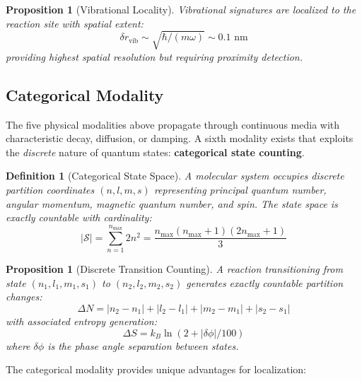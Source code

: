 \documentclass[11pt,a4paper]{article}
\newtheorem{definition}[theorem]{Definition}
\newtheorem{proposition}[theorem]{Proposition}
\theoremstyle{remark}
\begin{document}
\begin{proposition}[Vibrational Locality]
\label{prop:vib_local}
Vibrational signatures are localized to the reaction site with spatial extent:
\begin{equation}
    \delta r_{\text{vib}} \sim \sqrt{\hbar/(m\omega)} \sim 0.1 \text{ nm}
\end{equation}
providing highest spatial resolution but requiring proximity detection.
\end{proposition}

\subsection{Categorical Modality}
\label{sec:categorical_modality}

The five physical modalities above propagate through continuous media with characteristic decay, diffusion, or damping. A sixth modality exists that exploits the \textit{discrete} nature of quantum states: \textbf{categorical state counting}.

\begin{definition}[Categorical State Space]
A molecular system occupies discrete partition coordinates $(n, l, m, s)$ representing principal quantum number, angular momentum, magnetic quantum number, and spin. The state space is exactly countable with cardinality:
\begin{equation}
    |\mathcal{S}| = \sum_{n=1}^{n_{\max}} 2n^2 = \frac{n_{\max}(n_{\max}+1)(2n_{\max}+1)}{3}
\end{equation}
\end{definition}

\begin{proposition}[Discrete Transition Counting]
\label{prop:categorical_count}
A reaction transitioning from state $(n_1, l_1, m_1, s_1)$ to $(n_2, l_2, m_2, s_2)$ generates exactly countable partition changes:
\begin{equation}
    \Delta N = |n_2 - n_1| + |l_2 - l_1| + |m_2 - m_1| + |s_2 - s_1|
\end{equation}
with associated entropy generation:
\begin{equation}
    \Delta S = k_B \ln(2 + |\delta\phi|/100)
\end{equation}
where $\delta\phi$ is the phase angle separation between states.
\end{proposition}

The categorical modality provides unique advantages for localization:
\end{document}

